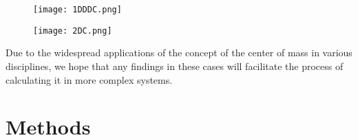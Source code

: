 \documentclass[11pt, twoside, reqno]{book}
\begin{document}
\begin{figure}[H]
\texttt{[image: 1DDDC.png]}
\end{figure}

\begin{figure}[H]
\texttt{[image: 2DC.png]}
\end{figure}

\noindent Due to the widespread applications of the concept of the center of mass in various disciplines, we hope that any findings in these cases will facilitate the process of calculating it in more complex systems.

\section{Methods}
\label{sec4}
\end{document}
